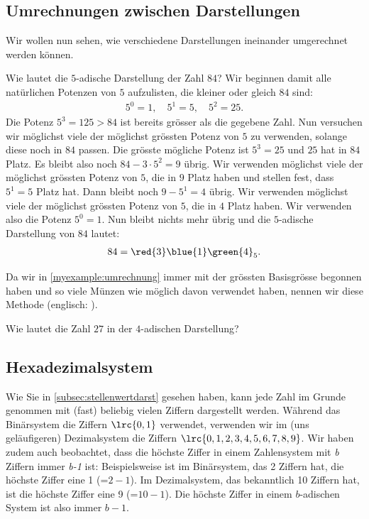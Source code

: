 \subsection{Umrechnungen zwischen Darstellungen}
Wir wollen nun sehen, wie verschiedene Darstellungen ineinander umgerechnet werden können.
\begin{myexample}\label{myexample:umrechnung}
  Wie lautet die $5$-adische Darstellung der Zahl $84$? Wir beginnen damit alle natürlichen Potenzen von $5$
  aufzulisten, die kleiner oder gleich $84$ sind:
  \begin{align*}
    5^0 = 1, \quad 5^1 = 5, \quad 5^2 = 25.
  \end{align*}
  Die Potenz $5^3 = 125 > 84$ ist bereits grösser als die gegebene Zahl. Nun versuchen wir möglichst viele der möglichst
  grössten Potenz von $5$ zu verwenden, solange diese noch in $84$ passen. Die grösste mögliche Potenz ist $5^3 = 25$ und
  $25$ hat  in $84$ Platz. Es bleibt also noch $84-3\cdot 5^2 = 9$ übrig. Wir verwenden möglichst viele der
  möglichst grössten Potenz von $5$, die in $9$ Platz haben und stellen fest, dass $5^1=5$  Platz hat. Dann
  bleibt noch $9-5^1 = 4$ übrig. Wir verwenden möglichst viele der möglichst grössten Potenz von $5$, die in $4$ Platz
  haben. Wir verwenden also  die Potenz $5^0 = 1$. Nun bleibt nichts mehr übrig und die $5$-adische
  Darstellung von $84$ lautet:
  \begin{align*}
    84 = \red{3}\blue{1}\green{4}_5.
  \end{align*}
\end{myexample}
Da wir in \cref{myexample:umrechnung} immer mit der grössten Basisgrösse begonnen haben und so viele Münzen wie möglich
davon verwendet haben, nennen wir diese Methode  (englisch: ).

\begin{myexercise}
  Wie lautet die Zahl $27$ in der $4$-adischen Darstellung?
\end{myexercise}

\subsection{Hexadezimalsystem}
Wie Sie in \cref{subsec:stellenwertdarst} gesehen haben, kann jede Zahl im Grunde genommen mit (fast) beliebig vielen Ziffern dargestellt werden. Während das Binärsystem die Ziffern $\lrc{0,1}$ verwendet, verwenden wir im (uns geläufigeren) Dezimalsystem die Ziffern $\lrc{0,1,2,3,4,5,6,7,8,9}$. Wir haben zudem auch beobachtet, dass die höchste Ziffer in einem Zahlensystem mit \textit{b} Ziffern immer \textit{b-1} ist: Beispielsweise ist im Binärsystem, das 2 Ziffern hat, die höchste Ziffer eine 1 (=$2-1$). Im Dezimalsystem, das bekanntlich 10 Ziffern hat, ist die höchste Ziffer eine 9 (=$10-1$). Die höchste Ziffer in einem $b$-adischen System ist also immer $b-1$.

